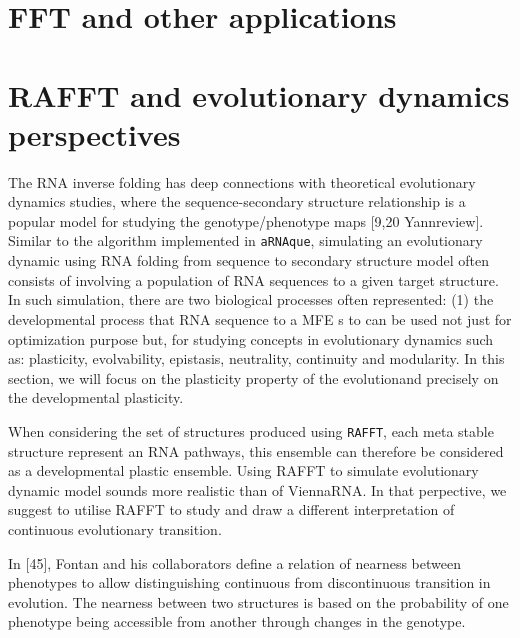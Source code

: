 \section{FFT and other applications}


\section{RAFFT and evolutionary dynamics perspectives}
The RNA inverse folding has deep connections with theoretical evolutionary dynamics studies, where the sequence-secondary structure relationship is a popular model for studying the genotype/phenotype maps [9,20 Yannreview].  Similar to the algorithm implemented in \texttt{aRNAque}, simulating an evolutionary dynamic using RNA folding from sequence to secondary structure model often consists of involving a population of RNA sequences to a given target structure. In such simulation, there are two biological processes often represented: (1) the developmental process that  RNA sequence to a MFE s to can be used not just for optimization purpose but, for studying concepts in evolutionary dynamics such as: plasticity, evolvability, epistasis, neutrality, continuity and modularity. In this section, we will focus on the plasticity property of the evolutionand precisely on the developmental plasticity. 

When considering the set of structures produced using \texttt{RAFFT}, each meta stable structure represent an RNA pathways, this ensemble can therefore be considered as a developmental plastic ensemble. Using RAFFT to simulate evolutionary dynamic model sounds more realistic than of ViennaRNA. In that perpective, we suggest to utilise RAFFT to study and draw a different interpretation of continuous evolutionary transition. 

In [45], Fontan and his collaborators define  a relation of nearness between phenotypes to allow distinguishing continuous from discontinuous transition in evolution. The nearness between two structures is based on the probability of one phenotype being accessible from another through changes in the genotype.  
